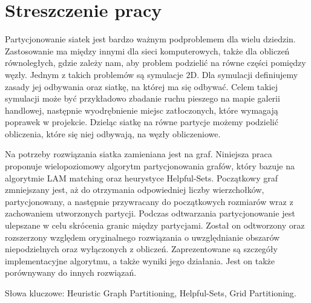 \section{Streszczenie pracy}
Partycjonowanie siatek jest bardzo ważnym podproblemem dla wielu dziedzin.
Zastosowanie ma między innymi dla sieci komputerowych, także dla obliczeń równoległych, gdzie zależy nam,
aby problem podzielić na równe części pomiędzy węzły.
Jednym z takich problemów są symulacje $2$D.
Dla symulacji definiujemy zasady jej odbywania oraz siatkę, na której ma się odbywać.
Celem takiej symulacji może być przykładowo zbadanie ruchu pieszego na mapie galerii handlowej, następnie wyodrębnienie miejsc
zatłoczonych, które wymagają poprawek w projekcie.
Dzieląc siatkę na równe partycje możemy podzielić obliczenia, które się niej odbywają, na węzły obliczeniowe.

Na potrzeby rozwiązania siatka zamieniana jest na graf.
Niniejsza praca proponuje wielopoziomowy algorytm partycjonowania grafów, który bazuje na algorytmie LAM
matching oraz heurystyce Helpful-Sets.
Początkowy graf zmniejszany jest, aż do otrzymania odpowiedniej liczby wierzchołków, partycjonowany, a następnie
przywracany do początkowych rozmiarów wraz z zachowaniem utworzonych partycji.
Podczas odtwarzania partycjonowanie jest ulepszane w celu skrócenia granic między partycjami.
Został on odtworzony oraz rozszerzony względem oryginalnego rozwiązania o uwzględnianie obszarów niepodzielnych
oraz wyłączonych z obliczeń.
Zaprezentowane są szczegóły implementacyjne algorytmu, a także wyniki jego działania.
Jest on także porównywany do innych rozwiązań.

\newline
\vspace{10mm}

Słowa kluczowe: Heuristic Graph Partitioning, Helpful-Sets, Grid Partitioning.